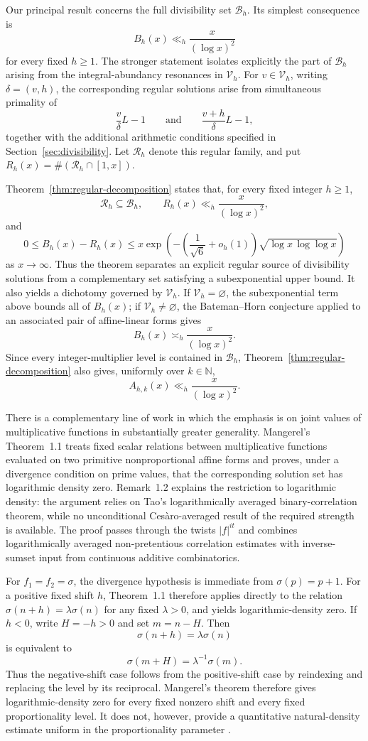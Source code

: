\documentclass[11pt,reqno]{amsart}
\numberwithin{equation}{section}
\theoremstyle{plain}
\theoremstyle{definition}
\theoremstyle{remark}
\newcommand{\N}{\mathbb N}
\begin{document}
Our principal result concerns the full divisibility set $\mathcal B_h$. Its simplest consequence is
\[
B_h(x)\ll_h\frac{x}{(\log x)^2}
\]
for every fixed $h\ge1$. The stronger statement isolates explicitly the part of $\mathcal B_h$ arising from the integral-abundancy resonances in $\mathcal V_h$. For $v\in\mathcal V_h$, writing $\delta=(v,h)$, the corresponding regular solutions arise from simultaneous primality of
\[
\frac{v}{\delta}L-1
\qquad\text{and}\qquad
\frac{v+h}{\delta}L-1,
\]
together with the additional arithmetic conditions specified in Section~\ref{sec:divisibility}. Let $\mathcal R_h$ denote this regular family, and put $R_h(x)=\#(\mathcal R_h\cap[1,x])$.

Theorem~\ref{thm:regular-decomposition} states that, for every fixed integer
$h\ge1$,
\[
\mathcal R_h\subseteq\mathcal B_h,
\qquad
R_h(x)\ll_h\frac{x}{(\log x)^2},
\]
and
\[
0\le B_h(x)-R_h(x)
\le
x\exp\!\left(
-\left(\frac1{\sqrt6}+o_h(1)\right)
\sqrt{\log x\,\log\log x}
\right)
\]
as $x\to\infty$. Thus the theorem separates an explicit regular source of divisibility
solutions from a complementary set satisfying a subexponential upper bound. It also yields a dichotomy governed by $\mathcal V_h$. If $\mathcal V_h=\varnothing$, the subexponential term above bounds all of $B_h(x)$; if $\mathcal V_h\ne\varnothing$, the Bateman--Horn conjecture applied to an associated pair of affine-linear forms gives
\[
B_h(x)\asymp_h\frac{x}{(\log x)^2}.
\]
Since every integer-multiplier level is contained in $\mathcal B_h$, Theorem~\ref{thm:regular-decomposition} also gives, uniformly over $k\in\N$,
\[
A_{h,k}(x)\ll_h\frac{x}{(\log x)^2}.
\]

There is a complementary line of work in which the emphasis is on joint
values of multiplicative functions in substantially greater generality.
Mangerel's Theorem~1.1 treats fixed scalar relations between multiplicative
functions evaluated on two primitive nonproportional affine forms and
proves, under a divergence condition on prime values, that the corresponding
solution set has logarithmic density zero. Remark~1.2 explains the
restriction to logarithmic density: the argument relies on Tao's
logarithmically averaged binary-correlation theorem, while no unconditional
Ces\`aro-averaged result of the required strength is available. The proof
passes through the twists $|f|^{it}$ and combines logarithmically averaged
non-pretentious correlation estimates with inverse-sumset input from
continuous additive combinatorics.

For $f_1=f_2=\sigma$, the divergence hypothesis is immediate from
$\sigma(p)=p+1$. For a positive fixed shift $h$, Theorem~1.1 therefore
applies directly to the relation $\sigma(n+h)=\lambda\sigma(n)$ for any
fixed $\lambda>0$, and yields logarithmic-density zero. If $h<0$, write
$H=-h>0$ and set $m=n-H$. Then
\[
\sigma(n+h)=\lambda\sigma(n)
\]
is equivalent to
\[
\sigma(m+H)=\lambda^{-1}\sigma(m).
\]
Thus the negative-shift case follows from the positive-shift case by
reindexing and replacing the level by its reciprocal. Mangerel's theorem
therefore gives logarithmic-density zero for every fixed nonzero shift and
every fixed proportionality level. It does not, however, provide a
quantitative natural-density estimate uniform in the proportionality
parameter \cite{Mangerel2024}.
\end{document}
